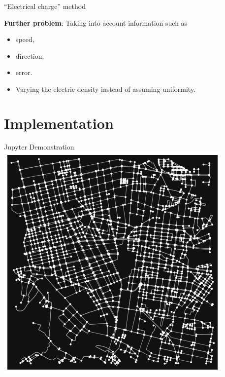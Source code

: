 \documentclass[aspectratio=169, bigfiles]{beamer}
\begin{document}
\begin{frame}{``Electrical charge'' method}
\begin{tcolorbox}[colframe=yellow,
colback=yellow!10!white,
colbacktitle=yellow!40!white,
coltitle=black, fonttitle=\bfseries]
\textbf{Further problem}: 
Taking into account information such as
\begin{itemize}
    \item
    speed,
    \item
    direction,
    \item
    error.
\end{itemize}
\end{tcolorbox}

\begin{itemize}
    \item
    Varying the electric density instead of assuming uniformity.
\end{itemize}
\end{frame}


\section{Implementation}
\begin{frame}{Jupyter Demonstration}
\centering
\includegraphics[height=0.7\paperheight,keepaspectratio]{Jupyter Notebook LaTeX/output_3_0.png}

\end{frame}
\end{document}
